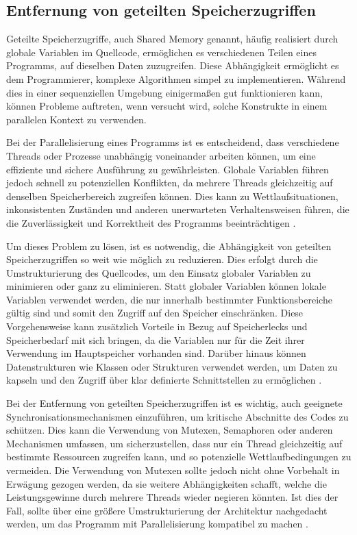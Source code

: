 \subsection{Entfernung von geteilten Speicherzugriffen}
\label{sec:Entfernung_geteilte_Speicherzugriffe}
Geteilte Speicherzugriffe, auch Shared Memory genannt, häufig realisiert durch globale Variablen im Quellcode, ermöglichen es verschiedenen Teilen eines Programms, auf dieselben Daten zuzugreifen. Diese Abhängigkeit ermöglicht es dem Programmierer, komplexe Algorithmen simpel zu implementieren. Während dies in einer sequenziellen Umgebung einigermaßen gut funktionieren kann, können Probleme auftreten, wenn versucht wird, solche Konstrukte in einem parallelen Kontext zu verwenden.

Bei der Parallelisierung eines Programms ist es entscheidend, dass verschiedene Threads oder Prozesse unabhängig voneinander arbeiten können, um eine effiziente und sichere Ausführung zu gewährleisten. Globale Variablen führen jedoch schnell zu potenziellen Konflikten, da mehrere Threads gleichzeitig auf denselben Speicherbereich zugreifen können. Dies kann zu Wettlaufsituationen, inkonsistenten Zuständen und anderen unerwarteten Verhaltensweisen führen, die die Zuverlässigkeit und Korrektheit des Programms beeinträchtigen \citep{Czech_2017_Shared_Memory}.

Um dieses Problem zu lösen, ist es notwendig, die Abhängigkeit von geteilten Speicherzugriffen so weit wie möglich zu reduzieren. Dies erfolgt durch die Umstrukturierung des Quellcodes, um den Einsatz globaler Variablen zu minimieren oder ganz zu eliminieren. Statt globaler Variablen können lokale Variablen verwendet werden, die nur innerhalb bestimmter Funktionsbereiche gültig sind und somit den Zugriff auf den Speicher einschränken. Diese Vorgehensweise kann zusätzlich Vorteile in Bezug auf Speicherlecks und Speicherbedarf mit sich bringen, da die Variablen nur für die Zeit ihrer Verwendung im Hauptspeicher vorhanden sind. Darüber hinaus können Datenstrukturen wie Klassen oder Strukturen verwendet werden, um Daten zu kapseln und den Zugriff über klar definierte Schnittstellen zu ermöglichen \citep{Czech_2017_Shared_Memory}.

Bei der Entfernung von geteilten Speicherzugriffen ist es wichtig, auch geeignete Synchronisationsmechanismen einzuführen, um kritische Abschnitte des Codes zu schützen. Dies kann die Verwendung von Mutexen, Semaphoren oder anderen Mechanismen umfassen, um sicherzustellen, dass nur ein Thread gleichzeitig auf bestimmte Ressourcen zugreifen kann, und so potenzielle Wettlaufbedingungen zu vermeiden. Die Verwendung von Mutexen sollte jedoch nicht ohne Vorbehalt in Erwägung gezogen werden, da sie weitere Abhängigkeiten schafft, welche die Leistungsgewinne durch mehrere Threads wieder negieren könnten. Ist dies der Fall, sollte über eine größere Umstrukturierung der Architektur nachgedacht werden, um das Programm mit Parallelisierung kompatibel zu machen \citep{Czech_2017_Shared_Memory}.

